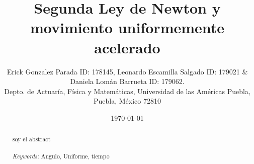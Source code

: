 \documentclass{article}
\begin{document}

\renewcommand{\footrulewidth}{1pt}
\renewcommand{\tablename}{Tabla}
\renewcommand{\figurename}{Figura}


\title{Segunda Ley de Newton y movimiento uniformemente acelerado}
\author{\small{Erick Gonzalez Parada ID: 178145, Leonardo Escamilla Salgado ID: 179021 $\&$ Daniela Lomán Barrueta ID: 179062.}\\		%
	   \small{Depto. de Actuaría, Física y Matemáticas, Universidad de las Américas Puebla, Puebla, M\'exico 72810}}
\date{\small{\today}}

\maketitle


\begin{abstract}

	soy el abstract
\\
\\
{\it Keywords:}  Angulo, Uniforme, tiempo
\\
\\
\end{abstract}

\end{document}
